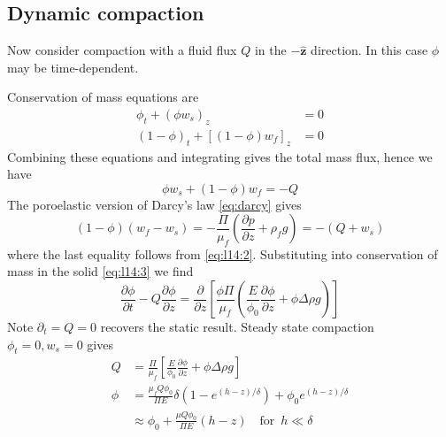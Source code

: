 \documentclass{jknotes}
\begin{document}
\subsection{Dynamic compaction}
Now consider compaction with a fluid flux $Q$ in the $-\symbf{\hat{z}}$
direction. In this case $\phi$ may be time-dependent.
\begin{center}
\end{center}
Conservation of mass equations are
\begin{align}
	\phi_t + (\phi w_s)_z &= 0 \label{eq:l14:3} \\
	(1-\phi)_t + \left[(1-\phi)w_f\right]_z &= 0
\end{align}
Combining these equations and integrating gives the total mass flux, hence we
have
\begin{equation}
	\phi w_s + (1-\phi)w_f = -Q
	\label{eq:l14:2}
\end{equation}
The poroelastic version of Darcy's law \eqref{eq:darcy} gives
\begin{equation}
	(1-\phi)(w_f - w_s) = -\frac{\Pi}{\mu_f} (\frac{\partial p}{\partial z} +
	\rho_f g) = -(Q+w_s)
\end{equation}
where the last equality follows from \eqref{eq:l14:2}. Substituting into
conservation of mass in the solid \eqref{eq:l14:3} we find
\begin{equation}
	\frac{\partial \phi}{\partial t} - Q\frac{\partial \phi}{\partial z} =
	\frac{\partial}{\partial z} \left[ \frac{\phi \Pi}{\mu_f} \left(
	\frac{E}{\phi_0} \frac{\partial \phi}{\partial z} + \phi \Delta \rho
	g\right) \right]
\end{equation}
Note $\partial_t = Q = 0$ recovers the static result. Steady state compaction
$\phi_t = 0, w_s = 0$ gives
\begin{align}
	Q &= \frac{\Pi}{\mu_f} \left[ \frac{E}{\phi_0}\frac{\partial \phi}{\partial
	z} + \phi \Delta \rho g\right] \\
	\phi &= \frac{\mu_f Q \phi_0}{\Pi E} \delta
	\left(1-e^{(h-z)/\delta}\right) + \phi_0 e^{(h-z)/\delta} \\
		 &\approx \phi_0 + \frac{\mu Q \phi_0}{\Pi E} (h-z) \hspace{1em}
		 \text{for}\,\,\, h \ll \delta
\end{align}
\end{document}
